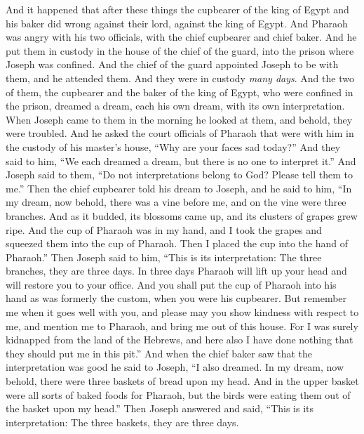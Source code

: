 \begin{biblechapter} %
 And it happened that after these things the cupbearer of the king of Egypt and his baker did wrong against their lord, against the king of Egypt.
\verse And Pharaoh was angry with his two officials, with the chief cupbearer and chief baker.
\verse And he put them in custody in the house of the chief of the guard, into the prison where Joseph was confined.
\verse And the chief of the guard appointed Joseph to be with them, and he attended them. And they were in custody \textit{many days}.
\verse And the two of them, the cupbearer and the baker of the king of Egypt, who were confined in the prison, dreamed a dream, each his own dream, with its own interpretation.
\verse When Joseph came to them in the morning he looked at them, and behold, they were troubled.
\verse And he asked the court officials of Pharaoh that were with him in the custody of his master’s house, “Why are your faces sad today?”
\verse And they said to him, “We each dreamed a dream, but there is no one to interpret it.” And Joseph said to them, “Do not interpretations belong to God? Please tell them to me.”
\verse Then the chief cupbearer told his dream to Joseph, and he said to him, “In my dream, now behold, there was a vine before me,
\verse and on the vine were three branches. And as it budded, its blossoms came up, and its clusters of grapes grew ripe.
\verse And the cup of Pharaoh was in my hand, and I took the grapes and squeezed them into the cup of Pharaoh. Then I placed the cup into the hand of Pharaoh.”
\verse Then Joseph said to him, “This is its interpretation: The three branches, they are three days.
\verse In three days Pharaoh will lift up your head and will restore you to your office. And you shall put the cup of Pharaoh into his hand as was formerly the custom, when you were his cupbearer.
\verse But remember me when it goes well with you, and please may you show kindness with respect to me, and mention me to Pharaoh, and bring me out of this house.
\verse For I was surely kidnapped from the land of the Hebrews, and here also I have done nothing that they should put me in this pit.”
\verse And when the chief baker saw that the interpretation was good he said to Joseph, “I also dreamed. In my dream, now behold, there were three baskets of bread upon my head.
\verse And in the upper basket were all sorts of baked foods for Pharaoh, but the birds were eating them out of the basket upon my head.”
\verse Then Joseph answered and said, “This is its interpretation: The three baskets, they are three days.

\end{biblechapter}
